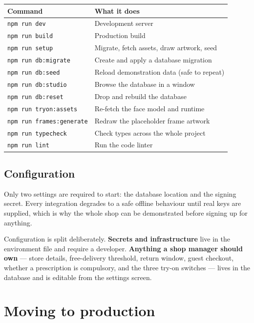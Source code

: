 \documentclass[11pt,a4paper]{report}
\newcommand{\code}[1]{\texttt{\small #1}}
\begin{document}
\begin{center}
\begin{tabular}{@{}ll@{}}
\toprule
\textbf{Command} & \textbf{What it does}\\
\midrule
\code{npm run dev} & Development server\\
\code{npm run build} & Production build\\
\code{npm run setup} & Migrate, fetch assets, draw artwork, seed\\
\code{npm run db:migrate} & Create and apply a database migration\\
\code{npm run db:seed} & Reload demonstration data (safe to repeat)\\
\code{npm run db:studio} & Browse the database in a window\\
\code{npm run db:reset} & Drop and rebuild the database\\
\code{npm run tryon:assets} & Re-fetch the face model and runtime\\
\code{npm run frames:generate} & Redraw the placeholder frame artwork\\
\code{npm run typecheck} & Check types across the whole project\\
\code{npm run lint} & Run the code linter\\
\bottomrule
\end{tabular}
\end{center}

\section{Configuration}

Only two settings are required to start: the database location and the signing
secret. Every integration degrades to a safe offline behaviour until real keys
are supplied, which is why the whole shop can be demonstrated before signing
up for anything.

Configuration is split deliberately. \textbf{Secrets and infrastructure} live
in the environment file and require a developer. \textbf{Anything a shop
manager should own} --- store details, free-delivery threshold, return window,
guest checkout, whether a prescription is compulsory, and the three try-on
switches --- lives in the database and is editable from the settings screen.

\chapter{Moving to production}
\end{document}
